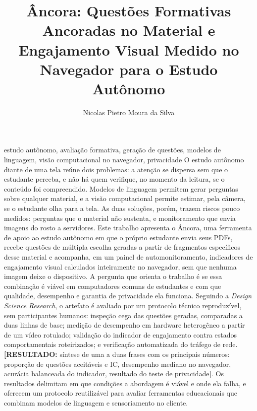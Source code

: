 \documentclass[portuguese,oneside]{tcc}
\author{Nicolas Pietro Moura da Silva}
\title{Âncora: Questões Formativas Ancoradas no Material e Engajamento Visual Medido no Navegador para o Estudo Autônomo}
      {Âncora: Material-Grounded Formative Questions and In-Browser Visual Engagement Measurement for Self-Directed Study}
\newcommand{\ferramenta}{Âncora\xspace}
\newcommand{\estr}[1]{\emph{#1}}
\newcommand{\resultado}[1]{\textcolor{red!70!black}{\textbf{[RESULTADO:} #1\textbf{]}}}
\begin{document}
\begin{resumo}{estudo autônomo, avaliação formativa, geração de questões, modelos de linguagem, visão computacional no navegador, privacidade}
O estudo autônomo diante de uma tela reúne dois problemas: a atenção se dispersa sem que o estudante perceba, e não há quem verifique, no momento da leitura, se o conteúdo foi compreendido. Modelos de linguagem permitem gerar perguntas sobre qualquer material, e a visão computacional permite estimar, pela câmera, se o estudante olha para a tela. As duas soluções, porém, trazem riscos pouco medidos: perguntas que o material não sustenta, e monitoramento que envia imagens do rosto a servidores. Este trabalho apresenta o \ferramenta, uma ferramenta de apoio ao estudo autônomo em que o próprio estudante envia seus PDFs, recebe questões de múltipla escolha geradas a partir de fragmentos específicos desse material e acompanha, em um painel de automonitoramento, indicadores de engajamento visual calculados inteiramente no navegador, sem que nenhuma imagem deixe o dispositivo. A pergunta que orienta o trabalho é se essa combinação é viável em computadores comuns de estudantes e com que qualidade, desempenho e garantia de privacidade ela funciona. Seguindo a \estr{Design Science Research}, o artefato é avaliado por um protocolo técnico reproduzível, sem participantes humanos: inspeção cega das questões geradas, comparadas a duas linhas de base; medição de desempenho em hardware heterogêneo a partir de um vídeo rotulado; validação do indicador de engajamento contra estados comportamentais roteirizados; e verificação automatizada do tráfego de rede. \resultado{síntese de uma a duas frases com os principais números: proporção de questões aceitáveis e IC, desempenho mediano no navegador, acurácia balanceada do indicador, resultado do teste de privacidade}. Os resultados delimitam em que condições a abordagem é viável e onde ela falha, e oferecem um protocolo reutilizável para avaliar ferramentas educacionais que combinam modelos de linguagem e sensoriamento no cliente.
\end{resumo}
\end{document}
